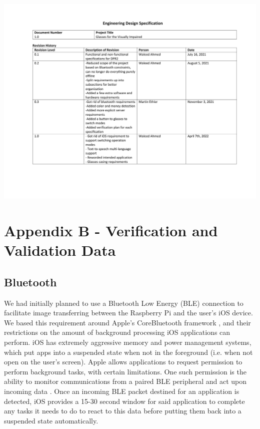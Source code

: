 \documentclass[a4paper,11pt]{article}
\begin{document}
\begin{landscape}
\begin{center}
        \newpage
        \includegraphics[page=6,width={0.86\linewidth}]{pdf/eds_1.0.pdf}
    \end{center}
\end{landscape}


\newpage
\section{Appendix B - Verification and Validation Data}
\subsection{Bluetooth}
\label{bluetooth}
We had initially planned to use a Bluetooth Low Energy (BLE) connection to facilitate image transferring between the Raspberry Pi and the user's iOS device. We based this requirement around Apple's CoreBluetooth framework \cite{apple-bluetooth}, and their restrictions on the amount of background processing iOS applications can perform. iOS has extremely aggressive memory and power management systems, which put apps into a suspended state when not in the foreground (i.e. when not open on the user's screen). Apple allows applications to request permission to perform background tasks, with certain limitations. One such permission is the ability to monitor communications from a paired BLE peripheral and act upon incoming data \cite{apple-bluetooth}. Once an incoming BLE packet destined for an application is detected, iOS provides a 15-30 second window for said application to complete any tasks it needs to do to react to this data before putting them back into a suspended state automatically.
\end{document}
